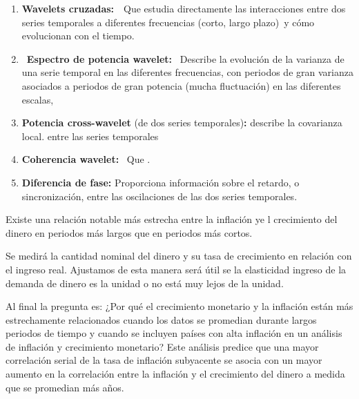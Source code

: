 \documentclass[a4paper,fleqn]{cas-sc}
\begin{document}
\begin{enumerate}

    \item  \textbf{Wavelets cruzadas:}  Que estudia directamente las interacciones entre dos series temporales a diferentes frecuencias (corto, largo plazo) y cómo evolucionan con el tiempo. 

    \item  \textbf{Espectro de potencia wavelet:}  Describe la evolución de la varianza de una serie temporal en las diferentes frecuencias, con periodos de gran varianza asociados a periodos de gran potencia (mucha fluctuación) en las diferentes escalas, 

\item  \textbf{Potencia cross-wavelet} (de dos series temporales)\textbf{:} describe la covarianza local. entre las series temporales 

    \item  \textbf{Coherencia wavelet:}  Que .

    \item  \textbf{Diferencia de fase:} Proporciona información sobre el retardo, o sincronización, entre las oscilaciones de las dos series temporales.

\end{enumerate}

Existe una relación notable más estrecha entre la inflación ye l crecimiento del dinero en periodos más largos que en periodos más cortos. 

Se medirá la cantidad nominal del dinero y su tasa de crecimiento en relación con el ingreso real. Ajustamos de esta manera será útil se la elasticidad ingreso de la demanda de dinero es la unidad o no está muy lejos de la unidad.

Al final la pregunta es: ¿Por qué el crecimiento monetario y la inflación están más estrechamente relacionados cuando los datos se promedian durante largos periodos de tiempo y cuando se incluyen países con alta inflación en un análisis de inflación y crecimiento monetario? Este análisis predice que una mayor correlación serial de la tasa de inflación subyacente se asocia con un mayor aumento en la correlación entre la inflación y el crecimiento del dinero a medida que se promedian más años.


\printcredits





\bio{}
\endbio
\end{document}

